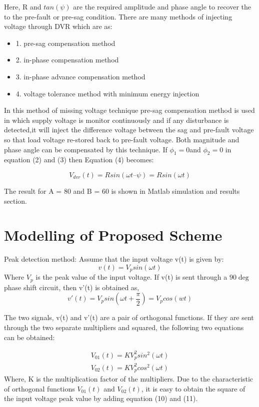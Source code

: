 \documentclass[journal,twoside]{IEEEtran}
\begin{document}
Here, R and $tan(\psi)$ are the required amplitude and phase angle to recover the to the pre-fault or pre-sag condition. There are many methods of injecting voltage through DVR which are as:
\begin{itemize}

\item{1.} pre-sag compensation method
\item{2.} in-phase compensation method
\item{3.} in-phase advance compensation method
\item{4.} voltage tolerance method with minimum energy
injection
\end{itemize}
In this method of missing voltage technique pre-sag compensation method is used in which supply voltage is monitor continuously and if any disturbance is detected,it will inject the difference voltage between the sag and pre-fault voltage so that load voltage re-stored back to pre-fault voltage. Both magnitude and phase angle can be compensated by this technique. 
If $\phi _1 = 0 $and $\phi _2 = 0$ in equation (2) and (3) then
Equation (4) becomes:

\begin{equation}
V_{dvr}(t)= Rsin(\omega t –\psi) = R sin(\omega t )
\end{equation}


The result for A = 80 and B = 60 is shown in Matlab
simulation and results section.
	

\section{Modelling of Proposed Scheme}

Peak detection method:
Assume that the input voltage v(t) is given by:
\begin{equation}
v(t) = V_psin(\omega t)
\end{equation}
Where $V_p$ is the peak value of the input voltage. If v(t) is
sent through a $90 \deg$ phase shift circuit, then v'(t) is
obtained as,
\begin{equation}
v'(t) =V_p sin(\omega t +\frac{\pi}{2} )=V_p cos(wt)
\end{equation}

The two signals, v(t) and v'(t) are a pair of orthogonal
functions. If they are sent through the two separate
multipliers and squared, the following two equations can
be obtained:

\begin{align}
V_{01}(t)=KV_p^2sin^2(\omega t)\\
V_{02}(t)=KV_p^2cos^2(\omega t)
\end{align}
Where, K is the multiplication factor of the multipliers.
Due to the characteristic of orthogonal functions $V_{01}(t)$
and $V_{02}(t)$, it is easy to obtain the square of the input
voltage peak value by adding equation (10) and (11).
\end{document}
